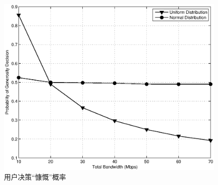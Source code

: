 \begin{figure}[!tb]
  \begin{minipage}[t]{0.6\linewidth} 
    \centering 
    \includegraphics[width = \textwidth]{bayesian_normal_bandwidth_vs_generosity} 
    \caption{用户决策“慷慨”概率} 
    \label{fig:chap_bayesian:normal_bandwidth_vs_generosity} 
  \end{minipage}%
\end{figure}

